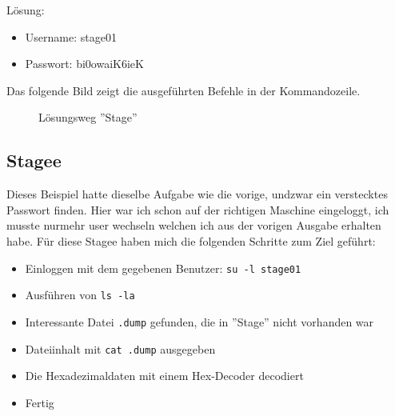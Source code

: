 \documentclass[12pt, a4paper, titlepage, oneside]{scrartcl}
\begin{document}
	Lösung:
	\begin{itemize}
		\item Username: stage01

		\item Passwort: bi0owaiK6ieK
	\end{itemize}
	Das folgende Bild zeigt die ausgeführten Befehle in der Kommandozeile.
	\begin{figure}[h!]
		\centering
		\caption{Lösungsweg ''Stage''}
		\label{fig:stage_solution}
	\end{figure}

	\subsection{Stagee}
	Dieses Beispiel hatte dieselbe Aufgabe wie die vorige, undzwar ein verstecktes
	Passwort finden. Hier war ich schon auf der richtigen Maschine eingeloggt, ich
	musste nurmehr user wechseln welchen ich aus der vorigen Ausgabe erhalten habe.
	Für diese Stagee haben mich die folgenden Schritte zum Ziel geführt:

	\begin{itemize}
		\item Einloggen mit dem gegebenen Benutzer: \lstinline{su -l stage01}

		\item Ausführen von \lstinline{ls -la}

		\item Interessante Datei \lstinline{.dump} gefunden, die in ''Stage'' nicht vorhanden
			war

		\item Dateiinhalt mit \lstinline{cat .dump} ausgegeben

		\item Die Hexadezimaldaten mit einem Hex-Decoder decodiert

		\item Fertig
	\end{itemize}
\end{document}
